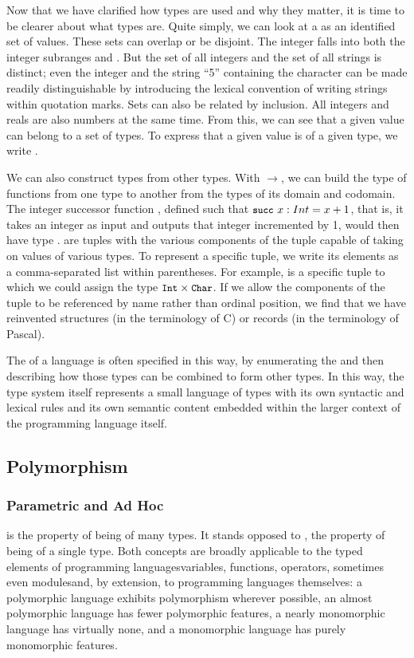 Now that we have clarified how types are used and why they matter, it is time to be clearer about what types are. Quite simply, we can look at a  as an identified set of values. These sets can overlap or be disjoint. The integer  falls into both the integer subranges  and . But the set of all integers and the set of all strings is distinct; even the integer  and the string ``5'' containing the character  can be made readily distinguishable by introducing the lexical convention of writing strings within quotation marks. Sets can also be related by inclusion. All integers and reals are also numbers at the same time. From this, we can see that a given value can belong to a set of types. To express that a given value is of a given type, we write .

We can also construct types from other types. With $\to$, we can build the type of functions from one type to another from the types of its domain and codomain. The integer successor function , defined such that $\text{\code{succ} } \stmt{x}{Int} = x + 1$, that is, it takes an integer as input and outputs that integer incremented by 1, would then have type .  are tuples with the various components of the tuple capable of taking on values of various types. To represent a specific tuple, we write its elements as a comma-separated list within parentheses. For example,  is a specific tuple to which we could assign the type $\text{{\small\ttfamily Int}} \times \text{{\small\ttfamily Char}}$. If we allow the components of the tuple to be referenced by name rather than ordinal position, we find that we have reinvented structures (in the terminology of C) or records (in the terminology of Pascal).

The  of a language is often specified in this way, by enumerating the  and then describing how those types can be combined to form other types. In this way, the type system itself represents a small language of types with its own syntactic and lexical rules and its own semantic content embedded within the larger context of the programming language itself.

\subsection{Polymorphism}
\subsubsection{Parametric and Ad Hoc}
 is the property of being of many types. It stands opposed to , the property of being of a single type. Both concepts are broadly applicable to the typed elements of programming languages\empause variables, functions, operators, sometimes even modules\empause and, by extension, to programming languages themselves: a polymorphic language exhibits polymorphism wherever possible, an almost polymorphic language has fewer polymorphic features, a nearly monomorphic language has virtually none, and a monomorphic language has purely monomorphic features.

